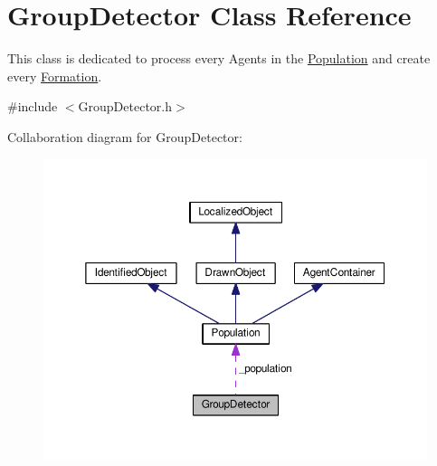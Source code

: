 \hypertarget{classGroupDetector}{}\section{Group\+Detector Class Reference}
\label{classGroupDetector}


This class is dedicated to process every Agents in the \hyperlink{classPopulation}{Population} and create every \hyperlink{classFormation}{Formation}.  




{\ttfamily \#include $<$Group\+Detector.\+h$>$}



Collaboration diagram for Group\+Detector\+:\nopagebreak
\begin{figure}[H]
\begin{center}
\leavevmode
\includegraphics[width=350pt]{classGroupDetector__coll__graph}
\end{center}
\end{figure}
